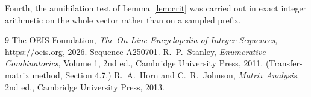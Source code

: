 \documentclass[11pt,a4paper]{article}
\theoremstyle{plain}
\theoremstyle{definition}
\begin{document}
Fourth, the annihilation test of Lemma~\ref{lem:crit} was carried out in exact integer
arithmetic on the whole vector rather than on a sampled prefix.

\begin{thebibliography}{9}
 The OEIS Foundation, \emph{The On-Line Encyclopedia of Integer
Sequences}, \url{https://oeis.org}, 2026. Sequence A250701.
 R.~P.~Stanley, \emph{Enumerative Combinatorics}, Volume 1, 2nd ed.,
Cambridge University Press, 2011. (Transfer-matrix method, Section 4.7.)
 R.~A.~Horn and C.~R.~Johnson, \emph{Matrix Analysis}, 2nd ed., Cambridge
University Press, 2013.
\end{thebibliography}
\end{document}
